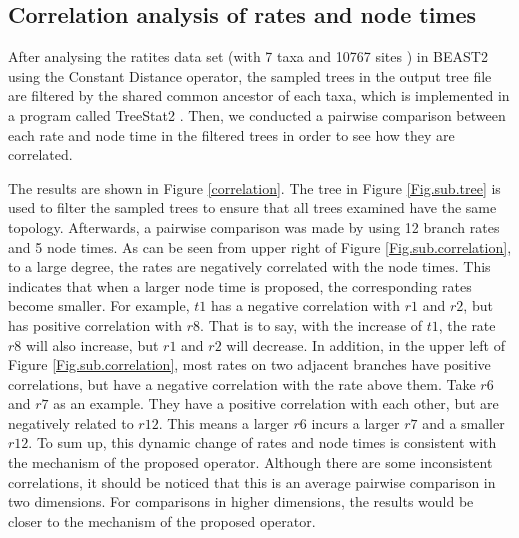 \documentclass{bmcart}
\begin{document}

\subsection*{Correlation analysis of rates and node times}
After analysing the ratites data set (with 7 taxa and 10767 sites \cite{cooper2001complete}) in BEAST2 using the Constant Distance operator, the sampled trees in the output tree file are filtered by the shared common ancestor of each taxa, which is implemented in a program called TreeStat2 \cite{TreeStat2}. Then, we conducted a pairwise comparison between each rate and node time in the filtered trees in order to see how they are correlated. 

The results are shown in Figure \ref{correlation}. The tree in Figure \ref{Fig.sub.tree} is used to filter the sampled trees to ensure that all trees examined have the same topology. Afterwards, a pairwise comparison was made by using 12 branch rates and 5 node times. As can be seen from upper right of Figure \ref{Fig.sub.correlation}, to a large degree, the rates are negatively correlated with the node times. This indicates that when a larger node time is proposed, the corresponding rates become smaller. For example, $t1$ has a negative correlation with $r1$ and $r2$, but has positive correlation with $r8$. That is to say, with the increase of $t1$, the rate $r8$ will also increase, but $r1$ and $r2$ will decrease. In addition, in the upper left of Figure \ref{Fig.sub.correlation}, most rates on two adjacent branches have positive correlations, but have a negative correlation with the rate above them. Take $r6$ and $r7$ as an example. They have a positive correlation with each other, but are negatively related to $r12$. This means a larger $r6$ incurs a larger $r7$ and a smaller $r12$. To sum up, this dynamic change of rates and node times is consistent with the mechanism of the proposed operator. Although there are some inconsistent correlations, it should be noticed that this is an average pairwise comparison in two dimensions. For comparisons in higher dimensions, the results would be closer to the mechanism of the proposed operator. 
\end{document}
